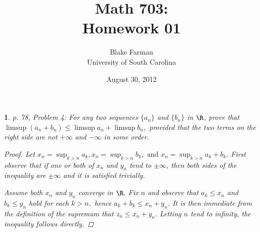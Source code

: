 \documentclass[10pt]{amsart}
\author{Blake Farman\\University of South Carolina}
\title{Math 703:\\Homework 01}
\date{August 30, 2012}
\begin{document}
\maketitle

\newtheorem{thm}{}
\begin{thm}{p. 78, Problem 4:}
  For any two sequences $\{a_n\}$ and $\{b_n\}$ in $\R$, prove that $\limsup{(a_n + b_n)} \leq \limsup{a_n} + \limsup{b_n},$ provided that the two terms on the right side are not $+\infty$ and $-\infty$ in some order. 
  \begin{proof}
    Let $x_n = \sup_{k>n}{a_k}, x_n = \sup_{k>n}{b_k}, \text{ and } x_n = \sup_{k>n}{a_k + b_k}.$
    First observe that if one or both of $x_n$ and $y_n$ tend to $\pm\infty$, then both sides of the inequality are $\pm\infty$ and it is satisfied trivially.

    Assume both $x_n$ and $y_n$ converge in $\R.$
    Fix $n$ and observe that $a_k \leq x_n$ and $b_k \leq y_n$ hold for each $k > n,$ hence $a_k + b_k \leq x_n + y_n$.
    It is then immediate from the definition of the supremum that $z_n \leq x_n + y_n.$
    Letting $n$ tend to infinity, the inequality follows directly.
    \end{proof}
\end{thm}
\end{document}
